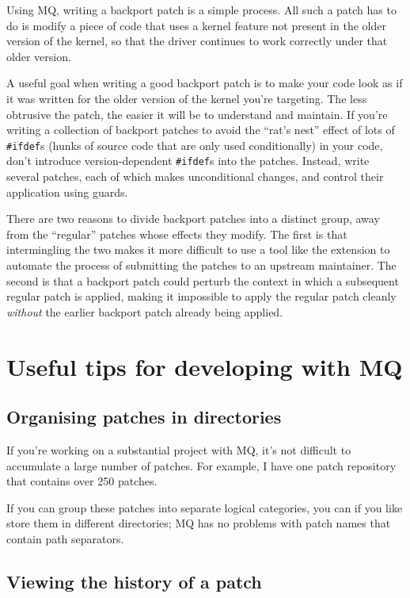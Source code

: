 Using MQ, writing a backport patch is a simple process.  All such a
patch has to do is modify a piece of code that uses a kernel feature
not present in the older version of the kernel, so that the driver
continues to work correctly under that older version.

A useful goal when writing a good backport patch is to make your code
look as if it was written for the older version of the kernel you're
targeting.  The less obtrusive the patch, the easier it will be to
understand and maintain.  If you're writing a collection of backport
patches to avoid the ``rat's nest'' effect of lots of
\texttt{\#ifdef}s (hunks of source code that are only used
conditionally) in your code, don't introduce version-dependent
\texttt{\#ifdef}s into the patches.  Instead, write several patches,
each of which makes unconditional changes, and control their
application using guards.

There are two reasons to divide backport patches into a distinct
group, away from the ``regular'' patches whose effects they modify.
The first is that intermingling the two makes it more difficult to use
a tool like the  extension to automate the process of
submitting the patches to an upstream maintainer.  The second is that
a backport patch could perturb the context in which a subsequent
regular patch is applied, making it impossible to apply the regular
patch cleanly \emph{without} the earlier backport patch already being
applied.

\section{Useful tips for developing with MQ}

\subsection{Organising patches in directories}

If you're working on a substantial project with MQ, it's not difficult
to accumulate a large number of patches.  For example, I have one
patch repository that contains over 250 patches.

If you can group these patches into separate logical categories, you
can if you like store them in different directories; MQ has no
problems with patch names that contain path separators.

\subsection{Viewing the history of a patch}
\label{mq-collab:tips:interdiff}


